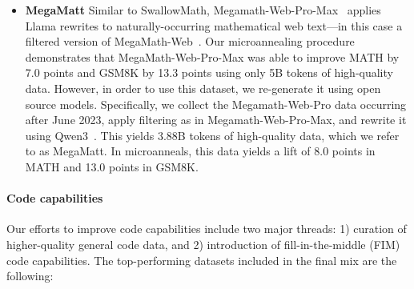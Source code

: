 \documentclass[table]{ai2style/ai2}
\begin{document}
\begin{itemize}
\item {\bf MegaMatt}
Similar to SwallowMath, Megamath-Web-Pro-Max~\citep{wang2025octothinker} applies Llama rewrites to naturally-occurring mathematical web text---in this case a filtered version of MegaMath-Web~\citep{zhou2025megamath}. Our microannealing procedure demonstrates that MegaMath-Web-Pro-Max was able to improve MATH by 7.0 points and GSM8K by 13.3 points using only 5B tokens of high-quality data. However, in order to use this dataset, we re-generate it using open source models. Specifically, we collect the Megamath-Web-Pro data occurring after June 2023, apply filtering as in Megamath-Web-Pro-Max, and rewrite it using Qwen3~\citep{qwen3}. This yields 3.88B tokens of high-quality data, which we refer to as MegaMatt. 
In microanneals, this data yields a lift of 8.0 points in MATH and 13.0 points in GSM8K.
\end{itemize}

\paragraph{Code capabilities}

Our efforts to improve code capabilities include two major threads: 1) curation of higher-quality general code data, and 2) introduction of fill-in-the-middle (FIM) code capabilities. The top-performing datasets included in the final mix are the following:
\end{document}
